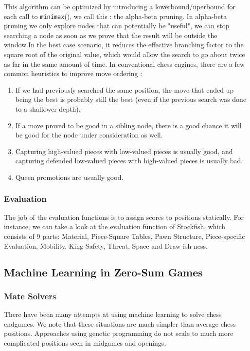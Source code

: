 			This algorithm can be optimized by introducing a lowerbound/uperbound for each call to \verb|minimax|(), we call this : the alpha-beta pruning.
			In alpha-beta pruning we only explore nodes that can potentially be "useful", we can stop searching a node as soon as we prove that the result will be outside the window.In the best case scenario, it reduces the effective branching factor to the square root of the original value, which would allow the search to go about twice as far in the same amount of time.
			In conventional chess engines, there are a few common heuristics to improve move ordering :
				\begin{enumerate}
					\item If we had previously searched the same position, the move that ended up being the best is probably still the best (even if the previous search was done to a shallower depth).
					\item If a move proved to be good in a sibling node, there is a good chance it will be good for the node under consideration as well.
					\item Capturing high-valued pieces with low-valued pieces is usually good, and capturing defended low-valued pieces with high-valued pieces is usually bad.
					\item Queen promotions are usually good.
				\end{enumerate}
			\subsubsection{Evaluation}

			The job of the evaluation functions is to assign scores to positions statically.
			For instance, we can take a look at the evaluation function of Stockfish, which consists of 9 parts: Material, Piece-Square Tables, Pawn Structure, Piece-specific Evaluation, Mobility, King Safety, Threat, Space and Draw-ish-ness.
		
		\subsection{Machine Learning in Zero-Sum Games}
			\subsubsection{Mate Solvers}

			There have been many attempts at using machine learning to solve chess endgames.
			We note that these situations are much simpler than average chess positions. Approaches using genetic programming do not scale to much more complicated positions seen in midgames and openings.	
			
